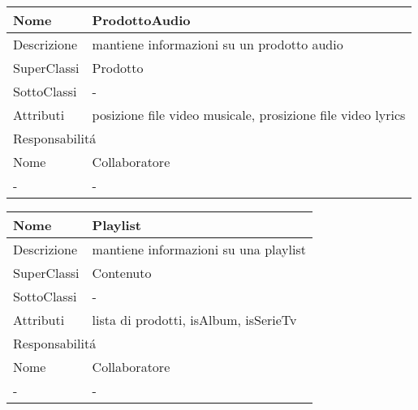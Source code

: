 \begin{center} %
    \begin{longtable}{ |p{3cm}|p{3cm}|p{3cm}|p{3cm}| }
        \hline
        Nome & \multicolumn{3}{|p{9cm}|}{ProdottoAudio} \\\hline
        Descrizione & \multicolumn{3}{|p{9cm}|}{mantiene informazioni su un prodotto audio} \\\hline
        SuperClassi & \multicolumn{3}{|p{9cm}|}{Prodotto} \\\hline
        SottoClassi & \multicolumn{3}{|p{9cm}|}{-} \\\hline
        Attributi & \multicolumn{3}{|p{9cm}|}{posizione file video musicale, prosizione file video lyrics} \\\hline
        \multicolumn{4}{|p{12cm}|}{Responsabilit\'a} \\\hline %
        \multicolumn{2}{|p{6cm}|}{Nome} & \multicolumn{2}{|p{6cm}|}{Collaboratore} \\\hline
        \multicolumn{2}{|p{6cm}|}{-} & \multicolumn{2}{|p{6cm}|}{-} \\\hline
    \end{longtable}
\end{center}

\begin{center} %
    \begin{longtable}{ |p{3cm}|p{3cm}|p{3cm}|p{3cm}| }
        \hline
        Nome & \multicolumn{3}{|p{9cm}|}{Playlist} \\\hline
        Descrizione & \multicolumn{3}{|p{9cm}|}{mantiene informazioni su una playlist} \\\hline
        SuperClassi & \multicolumn{3}{|p{9cm}|}{Contenuto} \\\hline
        SottoClassi & \multicolumn{3}{|p{9cm}|}{-} \\\hline
        Attributi & \multicolumn{3}{|p{9cm}|}{lista di prodotti, isAlbum, isSerieTv} \\\hline
        \multicolumn{4}{|p{12cm}|}{Responsabilit\'a} \\\hline %
        \multicolumn{2}{|p{6cm}|}{Nome} & \multicolumn{2}{|p{6cm}|}{Collaboratore} \\\hline
        \multicolumn{2}{|p{6cm}|}{-} & \multicolumn{2}{|p{6cm}|}{-} \\\hline
    \end{longtable}
\end{center}

